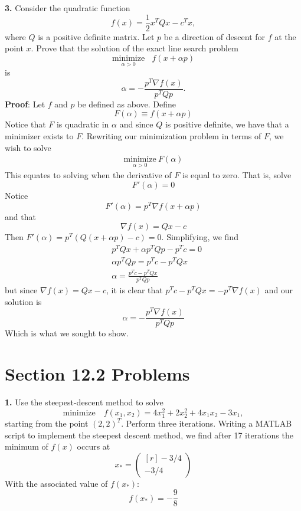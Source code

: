 \documentclass{article}
\newcommand{\minimize}[0]{\text{minimize}}
\begin{document}
\textbf{3.} Consider the quadratic function
\[f(x) = \frac{1}{2}x^TQx - c^Tx,\]
where $Q$ is a positive definite matrix. Let $p$ be a direction of descent for $f$ at the point $x$. Prove that the solution of the exact line search problem
\[\underset{\alpha > 0}{\minimize} \:\:\:\: f(x + \alpha p)\]
is
\[\alpha = -\frac{p^T\nabla f(x)}{p^TQp}.\]
\newline\newline
\textbf{Proof}: Let $f$ and $p$ be defined as above. Define
\[F(\alpha) \equiv f(x + \alpha p)\]
Notice that $F$ is quadratic in $\alpha$ and since $Q$ is positive definite, we have that a minimizer exists to $F$. Rewriting our minimization problem in terms of $F$, we wish to solve
\begin{align*}
    \underset{\alpha > 0}{\minimize}\: F(\alpha)
\end{align*}
This equates to solving when the derivative of $F$ is equal to zero. That is, solve 
\[F'(\alpha) = 0\]
Notice 
\[F'(\alpha) = p^T\nabla f(x + \alpha p)\]
and that 
\[\nabla f(x) = Qx - c\]
Then $F'(\alpha) = p^T(Q(x + \alpha p) - c) = 0$. Simplifying, we find
\begin{align*}
    &p^TQx + \alpha p^TQp - p^Tc = 0\\
    &\alpha p^TQp = p^Tc - p^TQx \\
    &\alpha = \frac{p^Tc - p^TQx}{p^TQp}
\end{align*}
but since $\nabla f(x) = Qx - c$, it is clear that $p^Tc - p^TQx = -p^T\nabla f(x)$ and our solution is
\[\alpha = -\frac{p^T\nabla f(x)}{p^TQp}\]
Which is what we sought to show.

\section*{Section 12.2 Problems}
\textbf{1.} Use the steepest-descent method to solve
\[\minimize \hspace{1em} f(x_1,x_2) = 4x_1^2 + 2x_2^2 + 4x_1x_2 - 3x_1,\]
starting from the point $(2,2)^T$. Perform three iterations.
\newline\newline
Writing a MATLAB script to implement the steepest descent method, we find after 17 iterations the minimum of $f(x)$ occurs at 
\[x_* = \begin{pmatrix*}[r]
    -3/4\\
    -3/4
\end{pmatrix*}\]
With the associated value of $f(x_*)$:
\[f(x_*) = -\frac{9}{8}\]
\end{document}

